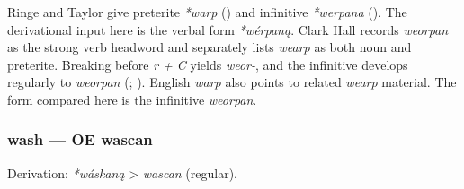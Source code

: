 \documentclass[
  british,
  a4paper,
]{article}
\begin{document}
Ringe and Taylor give preterite \emph{*warp}
() and
infinitive \emph{*werpana} (). The derivational input here is the verbal form
\emph{*wérpaną}. Clark Hall records \emph{weorpan} as the strong verb
headword and separately lists \emph{wearp} as both noun and preterite.
Breaking before \emph{r + C} yields \emph{weor-}, and the infinitive
develops regularly to \emph{weorpan}
(;
). English \emph{warp}
also points to related \emph{wearp} material. The form compared here is
the infinitive \emph{weorpan}.

\subsubsection{wash --- OE wascan}\label{wash-oe-wascan}

Derivation: \emph{*wáskaną} \textgreater{} \emph{wascan} (regular).

\begingroup
\setlength{\fboxsep}{6pt}
\end{document}
